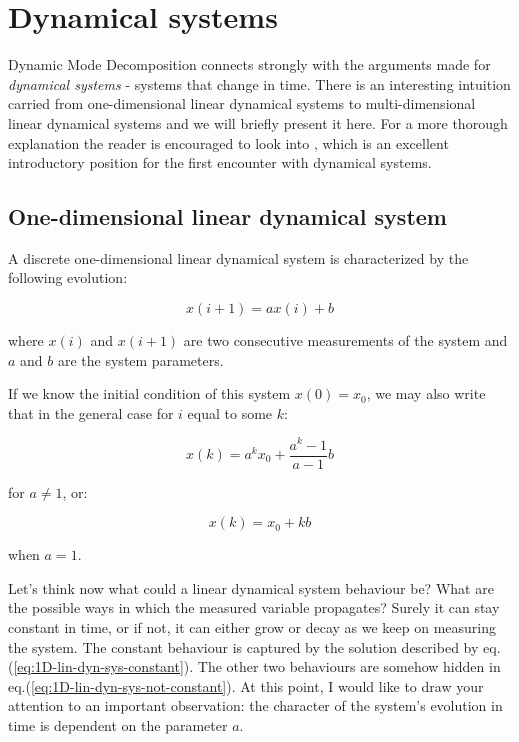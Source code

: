 \documentclass[10pt,twocolumn]{article}
\begin{document}
\section{Dynamical systems}

Dynamic Mode Decomposition connects strongly with the arguments made for \textit{dynamical systems} - systems that change in time. There is an interesting intuition carried from one-dimensional linear dynamical systems to multi-dimensional linear dynamical systems and we will briefly present it here. For a more thorough explanation the reader is encouraged to look into \cite{Prof_Edward_Scheinerman}, which is an excellent introductory position for the first encounter with dynamical systems.


\subsection{One-dimensional linear dynamical system}

A discrete one-dimensional linear dynamical system is characterized by the following evolution:

\begin{equation}
x(i+1) = a x(i) + b
\end{equation}

where $x(i)$ and $x(i+1)$ are two consecutive measurements of the system and $a$ and $b$ are the system parameters.

If we know the initial condition of this system $x(0) = x_0$, we may also write that in the general case for $i$ equal to some $k$:

\begin{equation} \label{eq:1D-lin-dyn-sys-not-constant}
x(k) = a^k x_0 + \frac{a^k - 1}{a - 1} b
\end{equation}

for $a \neq 1$, or:

\begin{equation} \label{eq:1D-lin-dyn-sys-constant}
x(k) = x_0 + k b
\end{equation}

when $a = 1$.

Let's think now what could a linear dynamical system behaviour be? What are the possible ways in which the measured variable propagates? Surely it can stay constant in time, or if not, it can either grow or decay as we keep on measuring the system. The constant behaviour is captured by the solution described by eq.(\ref{eq:1D-lin-dyn-sys-constant}). The other two behaviours are somehow hidden in eq.(\ref{eq:1D-lin-dyn-sys-not-constant}). At this point, I would like to draw your attention to an important observation: the character of the system's evolution in time is dependent on the parameter $a$.
\end{document}
